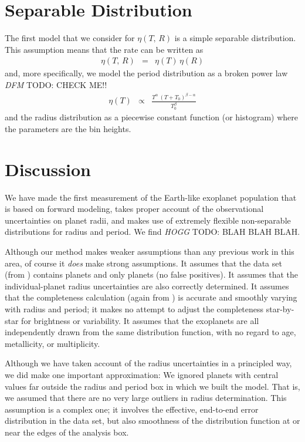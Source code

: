 \documentclass[12pt,preprint]{aastex}
\newcommand{\todo}[3]{{\color{#2} \emph{#1} TODO: #3}}
\newcommand{\dfmtodo}[1]{\todo{DFM}{red}{#1}}
\newcommand{\hoggtodo}[1]{\todo{HOGG}{blue}{#1}}
\newcommand{\rate}{\ensuremath{\eta}}
\newcommand{\radius}{\ensuremath{R}}
\newcommand{\period}{\ensuremath{T}}
\begin{document}
\section{Separable Distribution}

The first model that we consider for $\rate(\period,\,\radius)$ is a simple
separable distribution.
This assumption means that the rate can be written as
\begin{eqnarray}
\rate(\period,\,\radius) &=& \rate(\period)\,\rate(\radius)
\end{eqnarray}
and, more specifically, we model the period distribution as a broken power law
\dfmtodo{CHECK ME!!}
\begin{eqnarray}
\rate(\period) &\propto& \frac{\period^\alpha \,
(\period+\period_0)^{\beta-\alpha}}{\period_0^\beta}
\end{eqnarray}
and the radius distribution as a piecewise constant function (or histogram)
where the parameters are the bin heights.

\section{Discussion}

We have made the first measurement of the Earth-like exoplanet population that
is based on forward modeling, takes proper account of the observational
uncertainties on planet radii, and makes use of extremely flexible
non-separable distributions for radius and period.
We find \hoggtodo{BLAH BLAH BLAH.}

Although our method makes weaker assumptions than any previous work in this
area, of course it \emph{does} make strong assumptions.
It assumes that the data set (from \citealt{petigura}) contains planets and
only planets (no false positives).
It assumes that the individual-planet radius uncertainties are also correctly
determined.
It assumes that the completeness calculation (again from \citealt{petigura})
is accurate and smoothly varying with radius and period; it makes no attempt
to adjust the completeness star-by-star for brightness or variability.
It assumes that the exoplanets are all independently drawn from the same
distribution function, with no regard to age, metallicity, or multiplicity.

Although we have taken account of the radius uncertainties in a principled
way, we did make one important approximation: We ignored planets with central
values far outside the radius and period box in which we built the model.
That is, we assumed that there are no very large outliers in radius
determination.
This assumption is a complex one; it involves the effective, end-to-end error
distribution in the data set, but also smoothness of the distribution function
at or near the edges of the analysis box.
\end{document}
